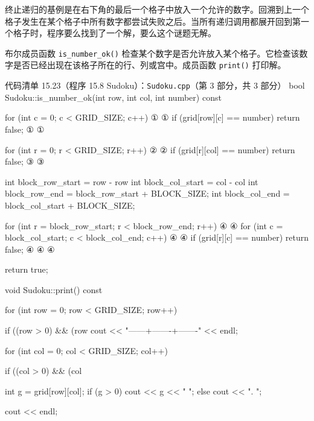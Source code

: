 终止递归的基例是在右下角的最后一个格子中放入一个允许的数字。回溯到上一个格子发生在某个格子中所有数字都尝试失败之后。当所有递归调用都展开回到第一个格子时，程序要么找到了一个解，要么这个谜题无解。

布尔成员函数 \texttt{is\_\allowbreak{}number\_\allowbreak{}ok(\allowbreak{})\allowbreak{}} 检查某个数字是否允许放入某个格子。它检查该数字是否已经出现在该格子所在的行、列或宫中。成员函数 \texttt{print()} 打印解。

\begin{codeboxt}{代码清单 15.23（程序 15.8 Sudoku）：\texttt{Sudoku.\allowbreak{}cpp}（第 3 部分，共 3 部分）}
bool Sudoku::is_number_ok(int row, int col, int number) const
{
    for (int c = 0; c < GRID_SIZE; c++)                       ①
    {                                                         ①
        if (grid[row][c] == number) return false;             ①
    }                                                         ①

    for (int r = 0; r < GRID_SIZE; r++)                       ②
    {                                                         ②
        if (grid[r][col] == number) return false;             ③
    }                                                         ③

    int block_row_start = row - row%
    int block_col_start = col - col%
    int block_row_end = block_row_start + BLOCK_SIZE;
    int block_col_end = block_col_start + BLOCK_SIZE;

    for (int r = block_row_start; r < block_row_end; r++)     ④
    {                                                         ④
        for (int c = block_col_start; c < block_col_end; c++) ④
        {                                                     ④
            if (grid[r][c] == number) return false;           ④
        }                                                     ④
    }                                                         ④

    return true;
}

void Sudoku::print() const
{
    for (int row = 0; row < GRID_SIZE; row++)
    {
        if ((row > 0) && (row%
        {
            cout << "------+-------+-------" << endl;
        }

        for (int col = 0; col < GRID_SIZE; col++)
        {
            if ((col > 0) && (col%

            int g = grid[row][col];
            if (g > 0) cout << g << " ";
            else       cout << ". ";
        }

        cout << endl;
    }
}
\end{codeboxt}
\par
{}\par
{}\par
{}\par

